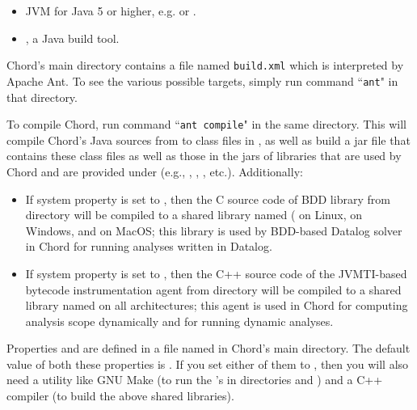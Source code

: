\begin{itemize}
\item
JVM for Java 5 or higher, e.g.  or
.
\item
{}, a Java build tool.
\end{itemize}

Chord's main directory contains a file named {\tt build.xml} which is interpreted by Apache Ant.  To see the various possible targets, simply
run command ``{\tt ant}" in that directory.

To compile Chord, run command ``{\tt ant compile}" in the same directory.  This will compile Chord's Java sources from  to class
files in , as well as build a jar file  that contains these class files as well as those in the jars of
libraries that are used by Chord and are provided under  (e.g., , , , etc.).
Additionally:

\begin{itemize}
\item

If system property  is set to , then the C source code of BDD library
 from directory  will be compiled to a shared library named ( on
Linux,  on Windows, and  on MacOS; this library is used by BDD-based Datalog solver
 in Chord for running analyses written in Datalog.

\item

If system property  is set to , then the C++ source code of the JVMTI-based bytecode instrumentation agent
from directory  will be compiled to a shared library named  on all architectures; this agent is
used in Chord for computing analysis scope dynamically and for running dynamic analyses.
\end{itemize}

Properties  and  are defined in a file named  in Chord's main directory.  The default
value of both these properties is .  If you set either of them to , then you will also need a utility like GNU Make
(to run the 's in directories  and ) and a C++ compiler (to build the above shared libraries).

